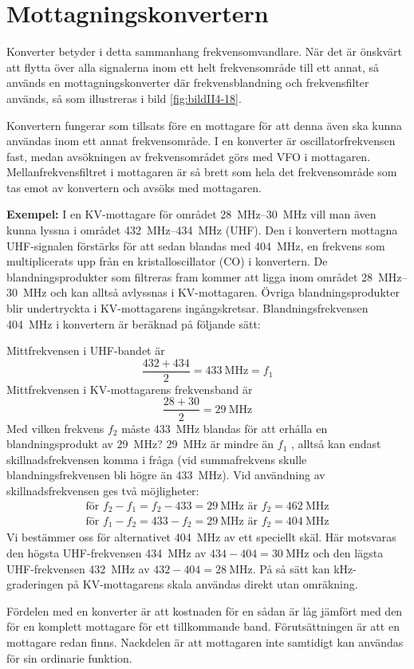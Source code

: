 \section{Mottagningskonvertern}


Konverter betyder i detta sammanhang frekvensomvandlare.
När det är önskvärt att flytta över alla signalerna inom ett helt frekvensområde
till ett annat, så används en mottagningskonverter där frekvensblandning och
frekvensfilter används, så som illustreras i bild \ref{fig:bildII4-18}.

Konvertern fungerar som tillsats före en mottagare för att denna även
ska kunna användas inom ett annat frekvensområde.
I en konverter är oscillatorfrekvensen fast, medan avsökningen av
frekvensområdet görs med VFO i mottagaren.
Mellanfrekvensfiltret i mottagaren är så brett som hela det frekvensområde
som tas emot av konvertern och avsöks med mottagaren.

\textbf{Exempel:}
I en KV-mottagare för området \SIrange{28}{30}{\mega\hertz} vill man även kunna
lyssna i området \SIrange{432}{434}{\mega\hertz} (UHF).
Den i konvertern mottagna UHF-signalen förstärks för att sedan blandas med
\SI{404}{\mega\hertz}, en frekvens som multiplicerats upp från en
kristalloscillator (CO) i konvertern.
De blandningsprodukter som filtreras fram kommer att ligga inom området
\SIrange{28}{30}{\mega\hertz} och kan alltså avlyssnas i KV-mottagaren.
Övriga blandningsprodukter blir undertryckta i KV-mottagarens ingångskretsar.
Blandningsfrekvensen \SI{404}{\mega\hertz} i konvertern är beräknad på följande
sätt:

\noindent
Mittfrekvensen i UHF-bandet är
\[\frac{432+434}{2} = \SI{433}{\mega\hertz} = f_1\]
Mittfrekvensen i KV-mottagarens frekvensband är
\[\frac{28 + 30}{2} = \SI{29}{\mega\hertz}\]
Med vilken frekvens \(f_2\) måste \SI{433}{\mega\hertz} blandas för att erhålla
en blandningsprodukt av \SI{29}{\mega\hertz}?
\SI{29}{\mega\hertz} är mindre än \(f_1\) , alltså kan endast
skillnadsfrekvensen komma i fråga (vid summafrekvens skulle blandningsfrekvensen
bli högre än \SI{433}{\mega\hertz}).
Vid användning av skillnadsfrekvensen ges två möjligheter:
\begin{gather*}
  \text{för }f_2 - f_1 = f_2 - 433 = \SI{29}{\mega\hertz}\text{ är }f_2 = \SI{462}{\mega\hertz} \\
  \text{för }f_1 - f_2 = 433 - f_2 = \SI{29}{\mega\hertz}\text{ är }f_2 = \SI{404}{\mega\hertz}
\end{gather*}
Vi bestämmer oss för alternativet \SI{404}{\mega\hertz} av ett speciellt skäl.
Här motsvaras den högsta UHF-frekvensen \SI{434}{\mega\hertz} av \(434 - 404 =
\SI{30}{\mega\hertz}\) och den lägsta UHF-frekvensen \SI{432}{\mega\hertz} av
\(432 - 404 = \SI{28}{\mega\hertz}\).
På så sätt kan kHz-graderingen på KV-mottagarens skala användas direkt utan
omräkning.

Fördelen med en konverter är att kostnaden för en sådan är låg jämfört
med den för en komplett mottagare för ett tillkommande band.
Förutsättningen är att en mottagare redan finns.
Nackdelen är att mottagaren inte samtidigt kan användas för sin
ordinarie funktion.
